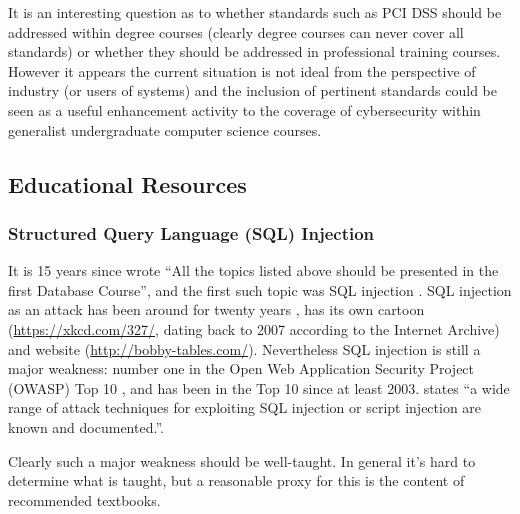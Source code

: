 \documentclass[conference]{IEEEtran}
\begin{document}
It is an interesting question as to whether standards such as PCI DSS should be addressed within degree courses (clearly degree courses can never cover all standards) or whether they should be addressed in professional training courses. However it appears the current situation is not ideal from the perspective of industry (or users of systems) and the inclusion of pertinent standards could be seen as a useful enhancement activity to the coverage of cybersecurity within generalist undergraduate computer science courses.

\subsection{Educational Resources}\label{sec:EDResource}
\subsubsection{Structured Query Language (SQL) Injection}\label{sec:SQL}
It is 15 years since \cite{Guimaraesetal2004} 
wrote ``All the topics listed above should be presented in the first
Database Course'', and the first such topic was SQL injection \cite{SPIDynamics2002,Anonymous2018b}. SQL injection as an attack has been around for twenty years \cite{HornerHyslip2017a}, has its own cartoon (\url{https://xkcd.com/327/}, dating back to 2007 according to the Internet Archive) and website (\url{http://bobby-tables.com/}). Nevertheless SQL injection is still a major weakness: number one in the Open Web Application Security Project (OWASP) Top 10 \cite{OWASP2017a}, and has been in the Top 10 since at least 2003.  \cite[the UK's definitive reference]{Bristol2018a} states ``a wide range of attack techniques for exploiting SQL
injection or script injection are known and documented.''.

Clearly such a major weakness should be well-taught.  In general it's hard to determine what is taught, but a reasonable proxy for this is the content of recommended textbooks. 
\end{document}
